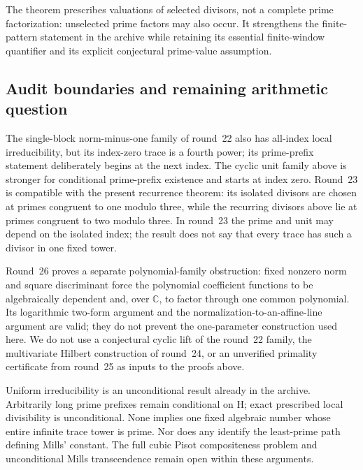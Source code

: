 \documentclass[11pt,a4paper]{article}
\theoremstyle{definition}\newtheorem{definition}[theorem]{Definition}
\theoremstyle{remark}\newtheorem{remark}[theorem]{Remark}
\begin{document}
The theorem prescribes valuations of selected divisors, not a complete
prime factorization: unselected prime factors may also occur. It
strengthens the finite-pattern statement in the archive while retaining
its essential finite-window quantifier and its explicit conjectural
prime-value assumption.

\subsection{Audit boundaries and remaining arithmetic question}
The single-block norm-minus-one family of round~22 also has all-index
local irreducibility, but its index-zero trace is a fourth power; its
prime-prefix statement deliberately begins at the next index. The
cyclic unit family above is stronger for conditional prime-prefix
existence and starts at index zero. Round~23 is compatible with the
present recurrence theorem: its isolated divisors are chosen at primes
congruent to one modulo three, while the recurring divisors above lie
at primes congruent to two modulo three. In round~23 the prime and unit
may depend on the isolated index; the result does not say that every
trace has such a divisor in one fixed tower.

Round~26 proves a separate polynomial-family obstruction: fixed nonzero
norm and square discriminant force the polynomial coefficient functions
to be algebraically dependent and, over $\mathbb C$, to factor through
one common polynomial. Its logarithmic two-form argument and the
normalization-to-an-affine-line argument are valid; they do not prevent
the one-parameter construction used here. We do not use a conjectural
cyclic lift of the round~22 family, the multivariate Hilbert construction
of round~24, or an unverified primality certificate from round~25 as
inputs to the proofs above.

Uniform irreducibility is an unconditional result already in the
archive. Arbitrarily long prime prefixes remain conditional on H;
exact prescribed local divisibility is unconditional. None implies
one fixed algebraic number whose entire infinite trace tower is prime.
Nor does any identify the least-prime path defining Mills' constant.
The full cubic Pisot compositeness problem and unconditional Mills
transcendence remain open within these arguments.

\end{document}
